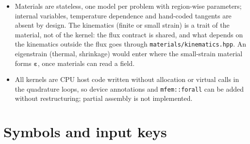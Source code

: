 \documentclass[11pt]{article}
\newcommand{\beps}{\bm{\varepsilon}}
\DeclareRobustCommand{\code}[1]{{\def\_{\textunderscore\allowbreak}\texttt{#1}}}
\DeclareRobustCommand{\file}[1]{{\def\_{\textunderscore\allowbreak}\texttt{#1}}}
\begin{document}
\begin{itemize}[nosep]
    residual (Section~\ref{sec:dynamics}).  The scalar transport, whose
    capacity may depend on the state, integrates its rate term inside the
    kernel instead, by implicit Euler from an accepted grid function; a
    first-order decorator with the generalized-$\alpha$ parameters and the
    same $\rho_\infty$ as the solid's, which is what a monolithic coupling
    of the two needs, would apply to its constant-capacity case.
  \item Materials are stateless, one model per problem with region-wise
    parameters; internal variables, temperature dependence and hand-coded
    tangents are absent by design.  The kinematics (finite or small strain)
    is a trait of the material, not of the kernel: the flux contract is
    shared, and what depends on the kinematics outside the flux goes through
    \file{materials/kinematics.hpp}.  An eigenstrain (thermal, shrinkage)
    would enter where the small-strain material forms $\beps$, once
    materials can read a field.
  \item All kernels are CPU host code written without allocation or
    virtual calls in the quadrature loops, so device annotations and
    \code{mfem::forall} can be added without restructuring; partial
    assembly is not implemented.
\end{itemize}

\appendix
\section{Symbols and input keys}
\end{document}
